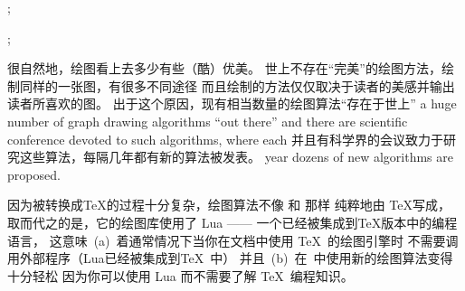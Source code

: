 \begin{codeexample}[]
\tikz {};
\end{codeexample}

\begin{codeexample}[]
\tikz {};  
\end{codeexample}

很自然地，绘图看上去多少有些（酷）优美。
世上不存在“完美”的绘图方法，绘制同样的一张图，有很多不同途径
而且绘制的方法仅仅取决于读者的美感并输出读者所喜欢的图。
出于这个原因，现有相当数量的绘图算法“存在于世上”
a huge number of graph drawing algorithms ``out there'' and there are
scientific conference devoted to such algorithms, where each
并且有科学界的会议致力于研究这些算法，每隔几年都有新的算法被发表。
year dozens of new algorithms are proposed.

因为被转换成\TeX 的过程十分复杂，绘图算法不像 \pgfname 和 \tikzname 那样
纯粹地由 \TeX 写成，
取而代之的是，它的绘图库使用了 Lua —— 一个已经被集成到\TeX 版本中的编程语言，
这意味\ (a)\ 着通常情况下当你在文档中使用 \TeX\ 的绘图引擎时
不需要调用外部程序（Lua已经被集成到\TeX\ 中）
并且\ (b)\ 在\tikzname\ 中使用新的绘图算法变得十分轻松
因为你可以使用 Lua 而不需要了解 \TeX\ 编程知识。



